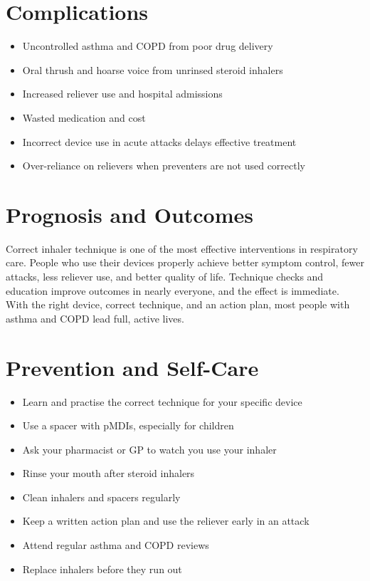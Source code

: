 \section*{Complications}
\begin{itemize}
    \item Uncontrolled asthma and COPD from poor drug delivery
    \item Oral thrush and hoarse voice from unrinsed steroid inhalers
    \item Increased reliever use and hospital admissions
    \item Wasted medication and cost
    \item Incorrect device use in acute attacks delays effective treatment
    \item Over-reliance on relievers when preventers are not used correctly
\end{itemize}

\section*{Prognosis and Outcomes}
Correct inhaler technique is one of the most effective interventions in respiratory care. People who use their devices properly achieve better symptom control, fewer attacks, less reliever use, and better quality of life. Technique checks and education improve outcomes in nearly everyone, and the effect is immediate. With the right device, correct technique, and an action plan, most people with asthma and COPD lead full, active lives.

\section*{Prevention and Self-Care}
\begin{itemize}
    \item Learn and practise the correct technique for your specific device
    \item Use a spacer with pMDIs, especially for children
    \item Ask your pharmacist or GP to watch you use your inhaler
    \item Rinse your mouth after steroid inhalers
    \item Clean inhalers and spacers regularly
    \item Keep a written action plan and use the reliever early in an attack
    \item Attend regular asthma and COPD reviews
    \item Replace inhalers before they run out
\end{itemize}

